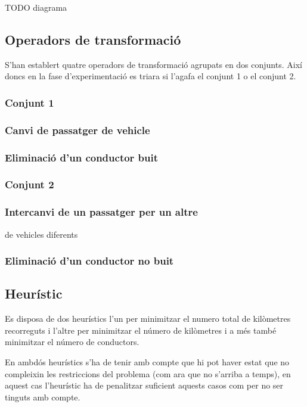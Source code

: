 TODO diagrama

\subsection{Operadors de transformació}
S'han establert quatre operadors de transformació agrupats en dos conjunts. Així doncs en la fase d'experimentació
es triara si l'agafa el conjunt 1 o el conjunt 2.

\subsubsection{Conjunt 1}
\subsubsection{Canvi de passatger de vehicle}

\subsubsection{Eliminació d'un conductor buit}

\subsubsection{Conjunt 2}
\subsubsection{Intercanvi de un passatger per un altre}
de vehicles diferents


\subsubsection{Eliminació d'un conductor no buit}

\subsection{Heurístic}
Es disposa de dos heurístics l'un per minimitzar el numero total de kilòmetres recorreguts i l'altre per
minimitzar el número de kilòmetres i a més també minimitzar el número de conductors.

En ambdós heurístics s'ha de tenir amb compte que hi pot haver estat que no compleixin les restriccions del problema
(com ara que no s'arriba a temps), en aquest cas l'heurístic ha de penalitzar suficient aquests casos com per no
ser tinguts amb compte.
